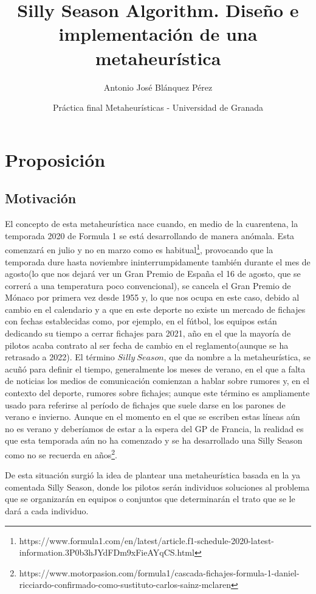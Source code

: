 \documentclass{article}
\title{\textbf{Silly Season Algorithm. Diseño e implementación de una metaheurística}}
\author{Antonio José Blánquez Pérez}
\date{Práctica final Metaheurísticas - Universidad de Granada}
\begin{document}
	\setlength{\parskip}{1em}
	\maketitle
	
	\section{Proposición}
	\subsection{Motivación}
	\indent El concepto de esta metaheurística nace cuando, en medio de la cuarentena, la temporada 2020 de Formula 1 se está desarrollando de manera anómala. Esta comenzará en julio y no en marzo como es habitual\footnote{https://www.formula1.com/en/latest/article.f1-schedule-2020-latest-information.3P0b3hJYdFDm9xFieAYqCS.html}, provocando que la temporada dure hasta noviembre ininterrumpidamente también durante el mes de agosto(lo que nos dejará ver un Gran Premio de España el 16 de agosto, que se correrá a una temperatura poco convencional), se cancela el Gran Premio de Mónaco por primera vez desde 1955 y, lo que nos ocupa en este caso, debido al cambio en el calendario y a que en este deporte no existe un mercado de fichajes con fechas establecidas como, por ejemplo, en el fútbol, los equipos están dedicando su tiempo a cerrar fichajes para 2021, año en el que la mayoría de pilotos acaba contrato al ser fecha de cambio en el reglamento(aunque se ha retrasado a 2022). El término $Silly\ Season$, que da nombre a la metaheurística, se acuñó para definir el tiempo, generalmente los meses de verano, en el que a falta de noticias los medios de comunicación comienzan a hablar sobre rumores y, en el contexto del deporte, rumores sobre fichajes; aunque este término es ampliamente usado para referirse al período de fichajes que suele darse en los parones de verano e invierno. Aunque en el momento en el que se escriben estas líneas aún no es verano y deberíamos de estar a la espera del GP de Francia, la realidad es que esta temporada aún no ha comenzado y se ha desarrollado una Silly Season como no se recuerda en años\footnote{https://www.motorpasion.com/formula1/cascada-fichajes-formula-1-daniel-ricciardo-confirmado-como-sustituto-carlos-sainz-mclaren}.
	\par
	De esta situación surgió la idea de plantear una metaheurística basada en la ya comentada Silly Season, donde los pilotos serán individuos soluciones al problema que se organizarán en equipos o conjuntos que determinarán el trato que se le dará a cada individuo.
	
\end{document}
